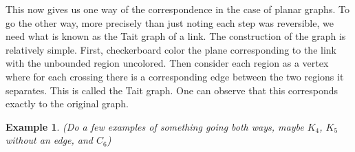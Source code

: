 \documentclass[12pt]{article}
\newtheorem*{example*}{Example}
\begin{document}
	\begin{center}
	\end{center}
This now gives us one way of the correspondence in the case of planar graphs. To go the other way, more precisely than just noting each step was reversible, we need what is known as the Tait graph of a link. The construction of the graph is relatively simple. First, checkerboard color the plane corresponding to the link with the unbounded region uncolored. Then consider each region as a vertex where for each crossing there is a corresponding edge between the two regions it separates. This is called the Tait graph. One can observe that this corresponds exactly to the original graph.

\begin{example*}
(Do a few examples of something going both ways, maybe $K_4$, $K_5$ without an edge, and $C_6$)	
\end{example*}
 
\end{document}
